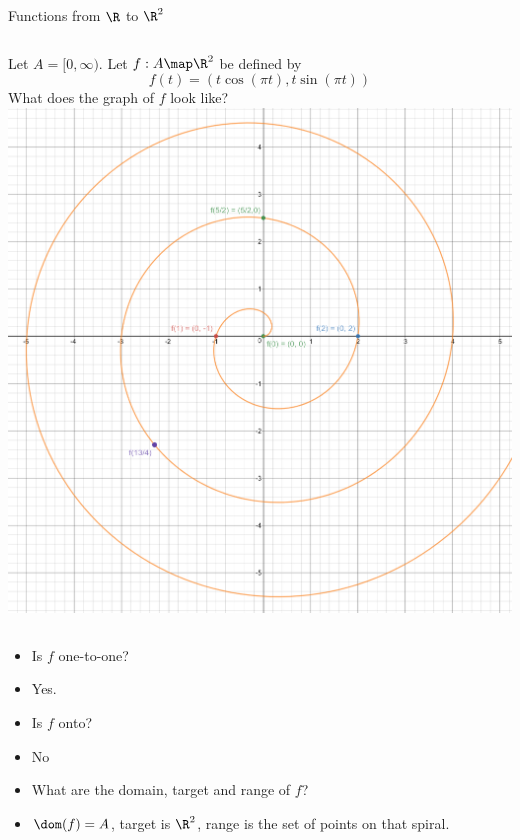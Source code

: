 \documentclass{beamer}
\begin{document}
\begin{frame}{Functions from $\R$ to $\R^2$}

\begin{columns}
\column[T]{5cm}
Let $A=[0, \infty)$. Let $f:A\map \R^2$ be defined by
$$f(t) = (t \cos(\pi t), t \sin(\pi t))$$
What does the graph of $f$ look like?
\column[T]{5cm}
\includegraphics[scale=0.1]{spiral}
\end{columns}

\begin{itemize}
\item Is $f$ one-to-one?
\item Yes.
\item Is $f$ onto?
\item No
\item What are the domain, target and range of $f$?
\item $\dom(f) = A$, target is $\R^2$, range is the set of points on that
spiral.
\end{itemize}

\end{frame}
\end{document}

